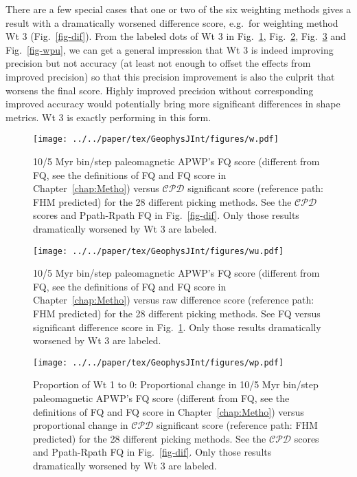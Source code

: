 There are a few special cases that one or two of the six weighting methods gives
a result with a dramatically worsened difference score, e.g.\ for weighting
method Wt 3 (Fig.~\ref{fig-dif}). From the labeled dots of Wt 3 in
Fig.~\ref{fig-w}, Fig.~\ref{fig-wu}, Fig.~\ref{fig-wp} and Fig.~\ref{fig-wpu},
we can get a general impression that Wt 3 is indeed improving precision
but not accuracy (at least not enough to offset the effects from improved
precision) so that this precision improvement is also the culprit that worsens
the final score. Highly improved precision without corresponding improved
accuracy would potentially bring more significant differences in shape metrics.
Wt 3 is exactly performing in this form.

\begin{figure}
\centering
\texttt{[image: ../../paper/tex/GeophysJInt/figures/w.pdf]}
\caption[Paleomagnetic APWP's FQ score vs significant difference score
(i.e. $\mathcal{CPD}$)]{10/5 Myr bin/step paleomagnetic APWP's FQ score (different
from FQ, see the definitions of FQ and FQ score in Chapter~\ref{chap:Metho})
versus $\mathcal{CPD}$ significant score (reference path: FHM predicted) for the
28 different picking methods. See the $\mathcal{CPD}$ scores and Ppath-Rpath FQ
in Fig.~\ref{fig-dif}. Only those results dramatically worsened by Wt 3
are labeled.}\label{fig-w}
\end{figure}

\begin{figure}
\centering
\texttt{[image: ../../paper/tex/GeophysJInt/figures/wu.pdf]}
\caption[Paleomagnetic APWP's FQ score vs raw difference score (i.e., no
statistical testing)]{10/5 Myr bin/step paleomagnetic APWP's FQ score (different
from FQ, see the definitions of FQ and FQ score in Chapter~\ref{chap:Metho})
versus raw difference score (reference path: FHM predicted) for the 28 different
picking methods. See FQ versus significant difference score in Fig.~\ref{fig-w}.
Only those results dramatically worsened by Wt 3 are labeled.}\label{fig-wu}
\end{figure}

\begin{figure}
\centering
\texttt{[image: ../../paper/tex/GeophysJInt/figures/wp.pdf]}
\caption[Proportional changes of Wt 1 to 0: Paleomagnetic
APWP's FQ score vs $\mathcal{CPD}$]{Proportion of Wt
1 to 0: Proportional change in 10/5 Myr bin/step paleomagnetic
APWP's FQ score (different from FQ, see the definitions of FQ and FQ score in
Chapter~\ref{chap:Metho}) versus proportional change in $\mathcal{CPD}$ significant score
(reference path: FHM predicted) for the 28 different picking methods. See the
$\mathcal{CPD}$ scores and Ppath-Rpath FQ in Fig.~\ref{fig-dif}.
Only those results dramatically worsened by Wt 3 are
labeled.}\label{fig-wp}
\end{figure}

